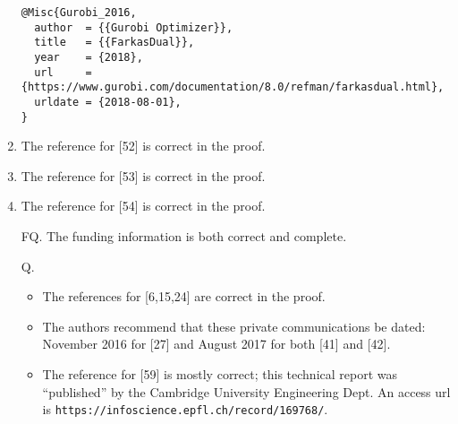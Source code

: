 \documentclass{article}
\begin{document}
\begin{enumerate}
\begin{verbatim}
@Misc{Gurobi_2016,
  author  = {{Gurobi Optimizer}},
  title   = {{FarkasDual}},
  year    = {2018},
  url     = {https://www.gurobi.com/documentation/8.0/refman/farkasdual.html},
  urldate = {2018-08-01},
}
        \end{verbatim}
        \item The reference for [52] is correct in the proof.
        \item The reference for [53] is correct in the proof.
        \item The reference for [54] is correct in the proof.
        \item[FQ.] The funding information is both correct and complete.
        \item[Q.]
        \begin{itemize}
            \item The references for [6,15,24] are correct in the proof.
            \item The authors recommend that these private communications be dated: November 2016 for [27] and August 2017 for both [41] and [42].
            \item The reference for [59] is mostly correct; this technical report was ``published'' by the Cambridge University Engineering Dept. An access url is \verb|https://infoscience.epfl.ch/record/169768/|.
        \end{itemize}
    \end{enumerate}
\end{document}
